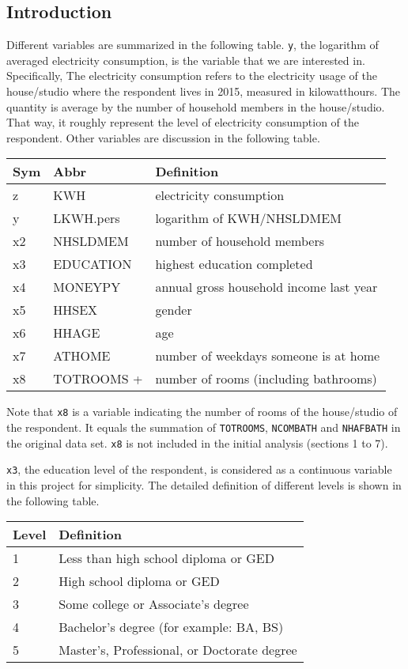\hypertarget{introduction}{%
\subsection{Introduction}\label{introduction}}

Different variables are summarized in the following table. \texttt{y},
the logarithm of averaged electricity consumption, is the variable that
we are interested in. Specifically, The electricity consumption refers
to the electricity usage of the house/studio where the respondent lives
in 2015, measured in kilowatthours. The quantity is average by the
number of household members in the house/studio. That way, it roughly
represent the level of electricity consumption of the respondent. Other
variables are discussion in the following table.

\begin{longtable}[]{@{}lll@{}}
\toprule
Sym & Abbr & Definition\tabularnewline
\midrule
\endhead
z & KWH & electricity consumption\tabularnewline
y & LKWH.pers & logarithm of KWH/NHSLDMEM\tabularnewline
x2 & NHSLDMEM & number of household members\tabularnewline
x3 & EDUCATION & highest education completed\tabularnewline
x4 & MONEYPY & annual gross household income last year\tabularnewline
x5 & HHSEX & gender\tabularnewline
x6 & HHAGE & age\tabularnewline
x7 & ATHOME & number of weekdays someone is at home\tabularnewline
x8 & TOTROOMS + & number of rooms (including bathrooms)\tabularnewline
\bottomrule
\end{longtable}

Note that \texttt{x8} is a variable indicating the number of rooms of
the house/studio of the respondent. It equals the summation of
\texttt{TOTROOMS}, \texttt{NCOMBATH} and \texttt{NHAFBATH} in the
original data set. \texttt{x8} is not included in the initial analysis
(sections 1 to 7).

\texttt{x3}, the education level of the respondent, is considered as a
continuous variable in this project for simplicity. The detailed
definition of different levels is shown in the following table.

\begin{longtable}[]{@{}ll@{}}
\toprule
Level & Definition\tabularnewline
\midrule
\endhead
1 & Less than high school diploma or GED\tabularnewline
2 & High school diploma or GED\tabularnewline
3 & Some college or Associate's degree\tabularnewline
4 & Bachelor's degree (for example: BA, BS)\tabularnewline
5 & Master's, Professional, or Doctorate degree\tabularnewline
\bottomrule
\end{longtable}

